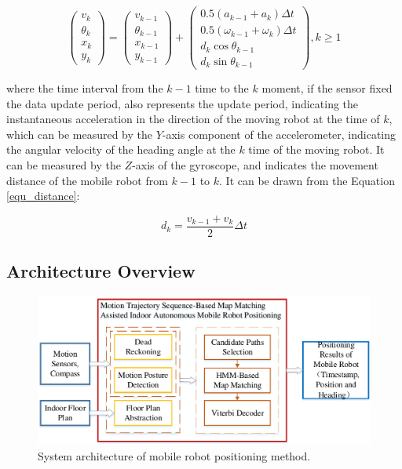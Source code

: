 \documentclass{llncs}
\begin{document}
\begin{equation}
\label{equ_dr}
\left( {\begin{array}{*{20}{c}}
	{{v_k}}\\
	{{\theta _k}}\\
	{{x_k}}\\
	{{y_k}}
	\end{array}} \right) = \left( {\begin{array}{*{20}{c}}
	{{v_{k - 1}}}\\
	{{\theta _{k - 1}}}\\
	{{x_{k - 1}}}\\
	{{y_{k - 1}}}
	\end{array}} \right) + \left( {\begin{array}{*{20}{c}}
	{0.5({a_{k - 1}} + {a_k})\Delta t}\\
	{0.5({\omega _{k - 1}} + {\omega _k})\Delta t}\\
	{{d_k}\cos {\theta _{k - 1}}}\\
	{{d_k}\sin {\theta _{k - 1}}}
	\end{array}} \right),k \ge 1
\end{equation}

where the time interval from the $k-1$ time to the $k$ moment, if the sensor fixed the data update period, also represents the update period, indicating the instantaneous acceleration in the direction of the moving robot at the time of $k$, which can be measured by the $Y$-axis component of the accelerometer, indicating the angular velocity of the heading angle at the $k$ time of the moving robot. It can be measured by the $Z$-axis of the gyroscope, and indicates the movement distance of the mobile robot from $k-1$ to $k$. It can be drawn from the Equation \ref{equ_distance}:

\begin{equation}
\label{equ_distance}
{d_k} = \frac{{{v_{k - 1}} + {v_k}}}{2}\Delta t
\end{equation}


\subsection{Architecture Overview}

\begin{figure}[!htbp]
	\centering
	\includegraphics[width=4.8in]{RobotMatch-Architecture}
	\caption{System architecture of mobile robot positioning method.}
	\label{fig-architect}
\end{figure}
\end{document}
